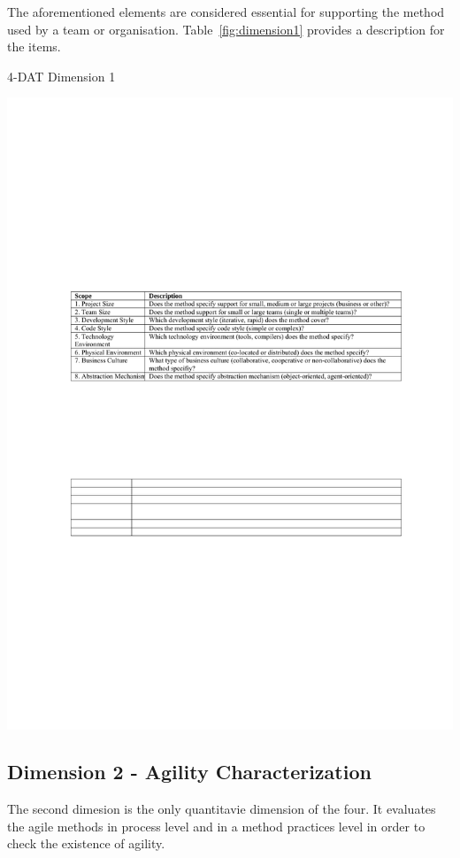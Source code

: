 The aforementioned elements are considered essential for supporting the method used by a team or organisation. Table~\ref{fig:dimension1} provides a description for the items.

\begin{table}[H]
\caption{4-DAT Dimension 1}
\label{fig:dimension1}
\centerline{\includegraphics[scale=0.8]{include/relatedwork/fig/qumer_dimension1.pdf}}
\end{table}

\subsection{Dimension 2 - Agility Characterization}
The second dimesion is the only quantitavie dimension of the four. It evaluates the agile methods in process level and in a method practices level in order to check the existence of agility.

